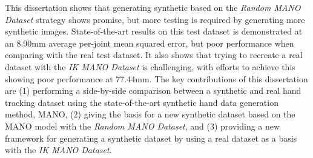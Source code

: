\documentclass[a4paper,oneside,12pt]{book}
\begin{document}
This dissertation shows that generating synthetic based on the {\slshape Random MANO Dataset} strategy shows promise, but more testing is required by generating more synthetic images. State-of-the-art results on this test dataset is demonstrated at an 8.90mm average per-joint mean squared error, but poor performance when comparing with the real test dataset. It also shows that trying to recreate a real dataset with the {\slshape IK MANO Dataset} is challenging, with efforts to achieve this showing poor performance at 77.44mm. The key contributions of this dissertation are (1) performing a side-by-side comparison between a synthetic and real hand tracking dataset using the state-of-the-art synthetic hand data generation method, MANO, (2) giving the basis for a new synthetic dataset based on the MANO model with the {\slshape Random MANO Dataset}, and (3) providing a new framework for generating a synthetic dataset by using a real dataset as a basis with the {\slshape IK MANO Dataset}.
\end{document}
